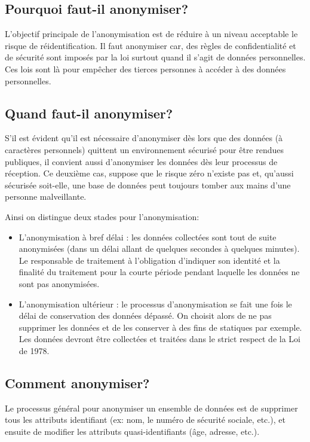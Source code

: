 \subsection{Pourquoi faut-il anonymiser?} 

L’objectif principale de l’anonymisation est de réduire à un niveau acceptable le risque de réidentification. Il faut anonymiser car, des règles de confidentialité et de sécurité sont imposés par la loi surtout quand il s’agit de données personnelles. Ces lois sont là pour empêcher des tierces personnes à accéder à des données personnelles\cite{}. 


\subsection{Quand faut-il anonymiser?} 

S’il est évident qu’il est nécessaire d’anonymiser dès lors que des données (à caractères personnels) quittent un environnement sécurisé pour être rendues publiques, il convient aussi d’anonymiser les données dès leur processus de réception. Ce deuxième cas, suppose que le risque zéro n’existe pas et, qu’aussi sécurisée soit-elle, une base de données peut toujours tomber aux mains d’une personne malveillante. 

Ainsi on distingue deux stades pour l’anonymisation: 
\begin{itemize}
\item L’anonymisation à bref délai : les données collectées sont tout de suite anonymisées (dans un délai allant de quelques secondes à quelques minutes). Le responsable de traitement à l’obligation d’indiquer son identité et la finalité du traitement pour la courte période pendant laquelle les données ne sont pas anonymisées.  

\item L’anonymisation ultérieur : le processus d’anonymisation se fait une fois le délai de conservation des données dépassé. On choisit alors de ne pas supprimer les données et de les conserver à des fins de statiques par exemple. Les données devront être collectées et traitées dans le strict respect de la Loi de 1978.
\end{itemize}
\subsection{Comment anonymiser?} 

Le processus général pour anonymiser un ensemble de données est de supprimer tous les attributs identifiant (ex: nom, le numéro de sécurité sociale, etc.), et ensuite de modifier les attributs quasi-identifiants (âge, adresse, etc.).  

